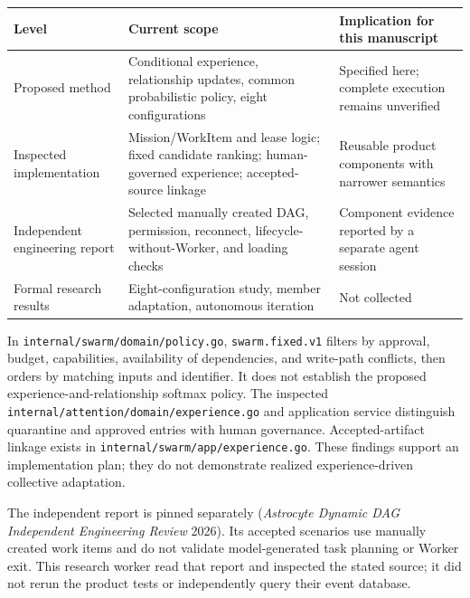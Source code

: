 \documentclass[
  english,
  11pt,
]{article}
\newcounter{none} %
\begin{document}
{\def\LTcaptype{none} %
\begin{longtable}[]{@{}
  >{\raggedright\arraybackslash}p{}
  >{\raggedright\arraybackslash}p{}
  >{\raggedright\arraybackslash}p{}@{}}
\toprule\noalign{}
\begin{minipage}[b]{\linewidth}\raggedright
Level
\end{minipage} & \begin{minipage}[b]{\linewidth}\raggedright
Current scope
\end{minipage} & \begin{minipage}[b]{\linewidth}\raggedright
Implication for this manuscript
\end{minipage} \\
\midrule\noalign{}
\endhead
\bottomrule\noalign{}
\endlastfoot
Proposed method & Conditional experience, relationship updates, common
probabilistic policy, eight configurations & Specified here; complete
execution remains unverified \\
Inspected implementation & Mission/WorkItem and lease logic; fixed
candidate ranking; human-governed experience; accepted-source linkage &
Reusable product components with narrower semantics \\
Independent engineering report & Selected manually created DAG,
permission, reconnect, lifecycle-without-Worker, and loading checks &
Component evidence reported by a separate agent session \\
Formal research results & Eight-configuration study, member adaptation,
autonomous iteration & Not collected \\
\end{longtable}
}

In \texttt{internal/swarm/domain/policy.go}, \texttt{swarm.fixed.v1}
filters by approval, budget, capabilities, availability of dependencies,
and write-path conflicts, then orders by matching inputs and identifier.
It does not establish the proposed experience-and-relationship softmax
policy. The inspected \texttt{internal/attention/domain/experience.go}
and application service distinguish quarantine and approved entries with
human governance. Accepted-artifact linkage exists in
\texttt{internal/swarm/app/experience.go}. These findings support an
implementation plan; they do not demonstrate realized experience-driven
collective adaptation.

The independent report is pinned separately (\emph{Astrocyte Dynamic
{DAG} Independent Engineering Review} 2026). Its accepted scenarios use
manually created work items and do not validate model-generated task
planning or Worker exit. This research worker read that report and
inspected the stated source; it did not rerun the product tests or
independently query their event database.
\end{document}
